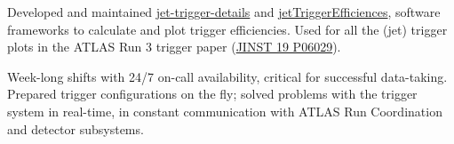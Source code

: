 
\begin{cventries}
    {Developed and maintained \href{https://gitlab.cern.ch/atlas-trigger/jet/jet-trigger-details}{jet-trigger-details} and \href{https://gitlab.cern.ch/atlas-trigger/jet/jetTriggerEfficiencies/-/tree/R22-master}{jetTriggerEfficiences}, software frameworks to calculate and plot trigger efficiencies. Used for all the (jet) trigger plots in the ATLAS Run 3 trigger paper (\href{https://doi.org/10.1088/1748-0221/19/06/P06029}{JINST 19 P06029}).}

    {Week-long shifts with 24/7 on-call availability, critical for successful data-taking. Prepared trigger configurations on the fly; solved problems with the trigger system in real-time, in constant communication with ATLAS Run Coordination and detector subsystems.}


\end{cventries}